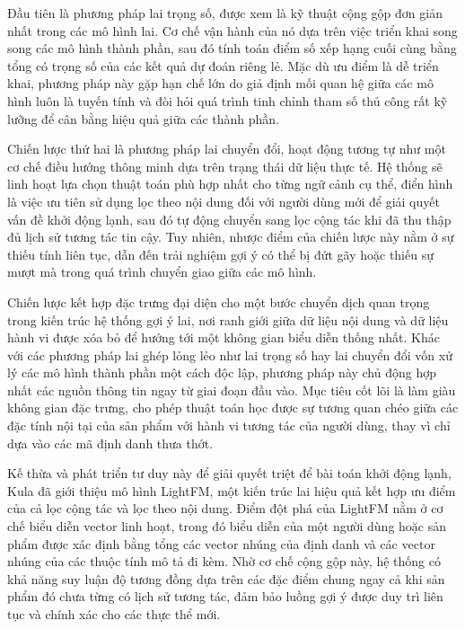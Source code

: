 Đầu tiên là phương pháp lai trọng số, được xem là kỹ thuật cộng gộp đơn giản nhất trong các mô hình lai. Cơ chế vận hành của nó dựa trên việc triển khai song song các mô hình thành phần, sau đó tính toán điểm số xếp hạng cuối cùng bằng tổng có trọng số của các kết quả dự đoán riêng lẻ\cite{18}. Mặc dù ưu điểm là dễ triển khai, phương pháp này gặp hạn chế lớn do giả định mối quan hệ giữa các mô hình luôn là tuyến tính và đòi hỏi quá trình tinh chỉnh tham số thủ công rất kỹ lưỡng để cân bằng hiệu quả giữa các thành phần.

Chiến lược thứ hai là phương pháp lai chuyển đổi, hoạt động tương tự như một cơ chế điều hướng thông minh dựa trên trạng thái dữ liệu thực tế. Hệ thống sẽ linh hoạt lựa chọn thuật toán phù hợp nhất cho từng ngữ cảnh cụ thể, điển hình là việc ưu tiên sử dụng lọc theo nội dung đối với người dùng mới để giải quyết vấn đề khởi động lạnh, sau đó tự động chuyển sang lọc cộng tác khi đã thu thập đủ lịch sử tương tác tin cậy\cite{18}. Tuy nhiên, nhược điểm của chiến lược này nằm ở sự thiếu tính liên tục, dẫn đến trải nghiệm gợi ý có thể bị đứt gãy hoặc thiếu sự mượt mà trong quá trình chuyển giao giữa các mô hình.

Chiến lược kết hợp đặc trưng đại diện cho một bước chuyển dịch quan trọng trong kiến trúc hệ thống gợi ý lai, nơi ranh giới giữa dữ liệu nội dung và dữ liệu hành vi được xóa bỏ để hướng tới một không gian biểu diễn thống nhất. Khác với các phương pháp lai ghép lỏng lẻo như lai trọng số hay lai chuyển đổi vốn xử lý các mô hình thành phần một cách độc lập, phương pháp này chủ động hợp nhất các nguồn thông tin ngay từ giai đoạn đầu vào. Mục tiêu cốt lõi là làm giàu không gian đặc trưng, cho phép thuật toán học được sự tương quan chéo giữa các đặc tính nội tại của sản phẩm với hành vi tương tác của người dùng, thay vì chỉ dựa vào các mã định danh thưa thớt.

Kế thừa và phát triển tư duy này để giải quyết triệt để bài toán khởi động lạnh, Kula\cite{20} đã giới thiệu mô hình LightFM, một kiến trúc lai hiệu quả kết hợp ưu điểm của cả lọc cộng tác và lọc theo nội dung. Điểm đột phá của LightFM nằm ở cơ chế biểu diễn vector linh hoạt, trong đó biểu diễn của một người dùng hoặc sản phẩm được xác định bằng tổng các vector nhúng của định danh và các vector nhúng của các thuộc tính mô tả đi kèm. Nhờ cơ chế cộng gộp này, hệ thống có khả năng suy luận độ tương đồng dựa trên các đặc điểm chung ngay cả khi sản phẩm đó chưa từng có lịch sử tương tác, đảm bảo luồng gợi ý được duy trì liên tục và chính xác cho các thực thể mới.

